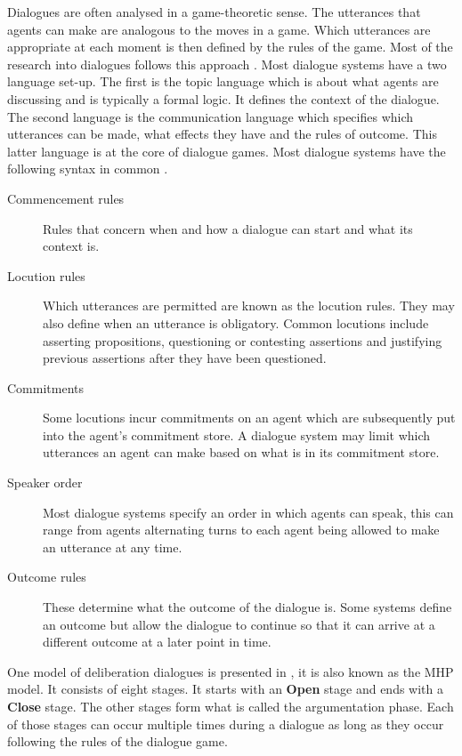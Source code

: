 Dialogues are often analysed in a game-theoretic sense. The utterances
that agents can make are analogous to the moves in a game. Which utterances are
appropriate at each moment is then defined by the rules of the game. Most of
the research into dialogues follows this approach
\cite{prakken2006,prakken2009}. Most dialogue systems have a two language
set-up. The first is the topic language which is about what agents are
discussing and is typically a formal logic. It defines the context of the
dialogue. The second language is the communication language which specifies
which utterances can be made, what effects they have and the rules of outcome.
This latter language is at the core of dialogue games. Most dialogue systems
have the following syntax in common \cite{prakken2006,prakken2009,mcburney2009}.
\begin{description}
    \item[Commencement rules] Rules that concern when and how a dialogue can
    start and what its context is.
    \item[Locution rules] Which utterances are permitted are known as the
    locution rules. They may also define when an utterance is obligatory.
    Common locutions include asserting propositions, questioning or contesting
    assertions and justifying previous assertions after they have been
    questioned.
    \item[Commitments] Some locutions incur commitments on an agent which are
    subsequently put into the agent's commitment store. A dialogue system may
    limit which utterances an agent can make based on what is in its commitment
    store.
    \item[Speaker order] Most dialogue systems specify an order in which agents
    can speak, this can range from agents alternating turns to each agent being
    allowed to make an utterance at any time.
    \item[Outcome rules] These determine what the outcome of the dialogue is.
    Some systems define an outcome but allow the dialogue to continue so that 
    it can arrive at a different outcome at a later point in time.
\end{description}
One model of deliberation dialogues is presented in \cite{mcburney2007}, it is
also known as the MHP model. It
consists of eight stages. It starts with an \textbf{Open} stage and ends with
a \textbf{Close} stage. The other stages form what is called the argumentation 
phase. Each of those stages can occur multiple times during a
dialogue as long as they occur following the rules of the dialogue game.
